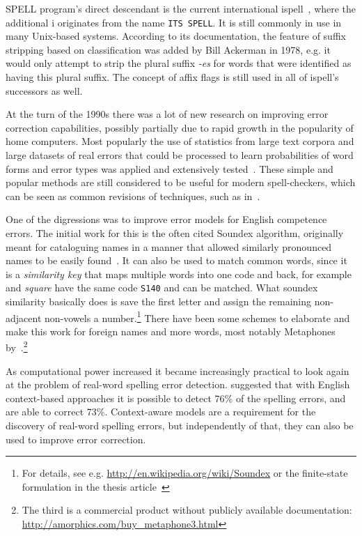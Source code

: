 \documentclass[officiallayout,final]{unihelcompling}
\newcommand\misspelt{\bgroup\markoverwith
{\lower3.5pt\hbox{\sixly \char58}}\ULon}
\newcommand\misspelt{\bgroup\markoverwith
{\textcolor{red}{\lower3.5pt\hbox{\sixly \char58}}}\ULon}
\begin{document}
SPELL program's direct descendant is the current international
ispell~\citep{gorin1971spell}, where the additional i originates from the name
\texttt{ITS SPELL}. It is still commonly in use in many Unix-based systems.
According to its documentation, the feature of suffix stripping based on
classification was added by Bill Ackerman in 1978, e.g. it would only attempt
to strip the plural suffix \emph{-es} for words that were identified as having
this plural suffix.  The concept of affix flags is still used in all of
ispell's successors as well.

At the turn of the 1990s there was a lot of new research on improving error
correction capabilities, possibly partially due to rapid growth in the
popularity of home computers. Most popularly the use of statistics from large
text corpora and large datasets of real errors that could be processed to learn
probabilities of word forms and error types was applied and extensively
tested~\citep{kernighan1990spelling,church1991probability}. These simple and
popular methods are still considered to be useful for modern spell-checkers,
which can be seen as common revisions of techniques, such as
in~\citet{brill2000improved}.

One of the digressions was to improve \glspl{error model} for English
competence errors. The initial work for this is the often cited Soundex
algorithm, originally meant for cataloguing names in a manner that allowed
similarly pronounced names to be easily found~\citep{russell1918soundex}. It
can also be used to match common words, since it is a \emph{similarity key}
that maps multiple words into one code and back, for example \misspelt{squer}
and \emph{square} have the same code \texttt{S140} and can be matched.  What
soundex similarity basically does is save the first letter and assign the
remaining non-adjacent non-vowels a number.\footnote{For details, see e.g.
\url{http://en.wikipedia.org/wiki/Soundex} or the finite-state formulation in
the thesis article~} There have been some
schemes to elaborate and make this work for foreign names and more words, most
notably Metaphones
by~\citet{philips1990hanging,philips2000double}.\footnote{The third is a
commercial product without publicly available documentation:
\url{http://amorphics.com/buy_metaphone3.html}}

As computational power increased it became increasingly practical to look again
at the problem of real-word spelling error detection.  \citet{mays1991context}
suggested that with English context-based approaches it is possible to detect
76\% of the spelling errors, and are able to correct 73\%.  Context-aware
models are a requirement for the discovery of real-word spelling errors, but
independently of that, they can also be used to improve error correction. 
\end{document}

